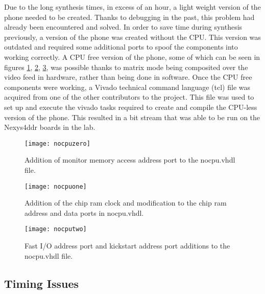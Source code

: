 Due to the long synthesis times, in excess of an hour, a light weight version of the phone needed to be created. Thanks to debugging in the past, this problem had already been encountered and solved. In order to save time during synthesis previously, a version of the phone was created without the CPU. This version was outdated and required some additional ports to spoof the components into working correctly. A CPU free version of the phone, some of which can be seen in figures \ref{fig:nocpuzero}, \ref{fig:nocpuone}, \ref{fig:nocputwo}, was possible thanks to matrix mode being composited over the video feed in hardware, rather than being done in software. Once the CPU free components were working, a Vivado technical command language (tcl) file was acquired from one of the other contributors to the project. This file was used to set up and execute the vivado tasks required to create and compile the CPU-less version of the phone. This resulted in a bit stream that was able to be run on the Nexys4ddr boards in the lab.

\begin{figure}
  \centering
  \texttt{[image: nocpuzero]}
  \caption{Addition of monitor memory access address port to the nocpu.vhdl file.}
  \label{fig:nocpuzero}
\end{figure}

\begin{figure}
  \centering
  \texttt{[image: nocpuone]}
  \caption{Addition of the chip ram clock and modification to the chip ram address and data ports in nocpu.vhdl.}
  \label{fig:nocpuone}
\end{figure}

\begin{figure}
  \centering
  \texttt{[image: nocputwo]}
  \caption{Fast I/O address port and kickstart address port additions to the nocpu.vhdl file.}
  \label{fig:nocputwo}
\end{figure}

\subsection{Timing Issues}

\label{Ch5 Sec1 Sub2}

